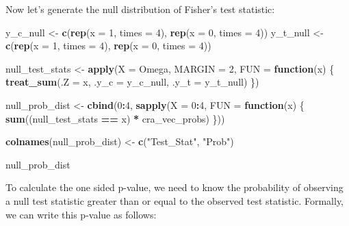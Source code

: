 \documentclass[12pt,leqno]{article}
\newenvironment{Shaded}{\begin{snugshade}}{\end{snugshade}}
\newcommand{\ControlFlowTok}[1]{\textcolor[rgb]{0.13,0.29,0.53}{\textbf{#1}}}
\newcommand{\DataTypeTok}[1]{\textcolor[rgb]{0.13,0.29,0.53}{#1}}
\newcommand{\DecValTok}[1]{\textcolor[rgb]{0.00,0.00,0.81}{#1}}
\newcommand{\KeywordTok}[1]{\textcolor[rgb]{0.13,0.29,0.53}{\textbf{#1}}}
\newcommand{\NormalTok}[1]{#1}
\newcommand{\OperatorTok}[1]{\textcolor[rgb]{0.81,0.36,0.00}{\textbf{#1}}}
\newcommand{\StringTok}[1]{\textcolor[rgb]{0.31,0.60,0.02}{#1}}
\theoremstyle{newstyle}
\begin{document}
Now let's generate the null distribution of Fisher's test statistic:

\begin{Shaded}
\begin{Highlighting}[]
\NormalTok{y_c_null <-}\StringTok{ }\KeywordTok{c}\NormalTok{(}\KeywordTok{rep}\NormalTok{(}\DataTypeTok{x =} \DecValTok{1}\NormalTok{, }\DataTypeTok{times =} \DecValTok{4}\NormalTok{), }\KeywordTok{rep}\NormalTok{(}\DataTypeTok{x =} \DecValTok{0}\NormalTok{, }\DataTypeTok{times =} \DecValTok{4}\NormalTok{))}
\NormalTok{y_t_null <-}\StringTok{ }\KeywordTok{c}\NormalTok{(}\KeywordTok{rep}\NormalTok{(}\DataTypeTok{x =} \DecValTok{1}\NormalTok{, }\DataTypeTok{times =} \DecValTok{4}\NormalTok{), }\KeywordTok{rep}\NormalTok{(}\DataTypeTok{x =} \DecValTok{0}\NormalTok{, }\DataTypeTok{times =} \DecValTok{4}\NormalTok{))}

\NormalTok{null_test_stats <-}\StringTok{ }\KeywordTok{apply}\NormalTok{(}\DataTypeTok{X =}\NormalTok{ Omega,}
                         \DataTypeTok{MARGIN =} \DecValTok{2}\NormalTok{,}
                         \DataTypeTok{FUN =} \ControlFlowTok{function}\NormalTok{(x) \{ }\KeywordTok{treat_sum}\NormalTok{(}\DataTypeTok{.Z =}\NormalTok{ x,}
                                                       \DataTypeTok{.y_c =}\NormalTok{ y_c_null,}
                                                       \DataTypeTok{.y_t =}\NormalTok{ y_t_null) \})}

\NormalTok{null_prob_dist <-}\StringTok{ }\KeywordTok{cbind}\NormalTok{(}\DecValTok{0}\OperatorTok{:}\DecValTok{4}\NormalTok{,}
                        \KeywordTok{sapply}\NormalTok{(}\DataTypeTok{X =} \DecValTok{0}\OperatorTok{:}\DecValTok{4}\NormalTok{,}
                               \DataTypeTok{FUN =} \ControlFlowTok{function}\NormalTok{(x) \{ }\KeywordTok{sum}\NormalTok{((null_test_stats }\OperatorTok{==}\StringTok{ }\NormalTok{x) }\OperatorTok{*}\StringTok{ }\NormalTok{cra_vec_probs) \}))}

\KeywordTok{colnames}\NormalTok{(null_prob_dist) <-}\StringTok{ }\KeywordTok{c}\NormalTok{(}\StringTok{"Test_Stat"}\NormalTok{, }\StringTok{"Prob"}\NormalTok{)}

\NormalTok{null_prob_dist}
\end{Highlighting}
\end{Shaded}

To calculate the one sided p-value, we need to know the probability of
observing a null test statistic greater than or equal to the observed
test statistic. Formally, we can write this p-value as follows:
\end{document}
